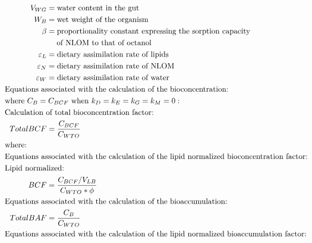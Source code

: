 \documentclass[10pt]{article}
\begin{document}
\begin{align*}
V_{WG} & = \text{water content in the gut} \nonumber \\
W_{B} & = \text{wet weight of the organism} \nonumber \\
\beta & = \text{proportionality constant expressing the sorption capacity} \nonumber\\ &\hspace{1.3em} \text{of NLOM to that of octanol} \nonumber \\
\varepsilon_{L} & = \text{dietary assimilation rate of lipids} \nonumber \\
\varepsilon_{N} & = \text{dietary assimilation rate of NLOM} \nonumber \\
\varepsilon_{W} & = \text{dietary assimilation rate of water} \nonumber \\
&    \hspace{-.75in}  \text{Equations associated with the calculation of the bioconcentration:}\nonumber \\ 
&    \hspace{-.75in}  \text{where } C_{B} = C_{BCF} \text{ when } k_{D}=k_{E}=k_{G}=k_{M}=0:\nonumber \\
&    \hspace{-.75in}  \text{Calculation of total bioconcentration factor:}\nonumber \\
Total BCF & = \frac{C_{BCF}}{C_{WTO}}\nonumber \\
&    \hspace{-.75in}  \text{where:}\nonumber \\
&    \hspace{-.75in}  \text{Equations associated with the calculation of the lipid normalized bioconcentration factor:}\nonumber \\
&    \hspace{-0.75in} \text{Lipid normalized:}\nonumber \\ 
BCF & = \frac{C_{BCF}/{V_{LB}}}{C_{WTO}*\phi}\nonumber \\
&    \hspace{-.75in}  \text{Equations associated with the calculation of the bioaccumulation:}\nonumber \\
Total BAF & = \frac{C_{B}}{C_{WTO}}\nonumber \\
&    \hspace{-.75in}  \text{Equations associated with the calculation of the lipid normalized bioaccumulation factor:}\nonumber \\

\end{align*}
\end{document}
